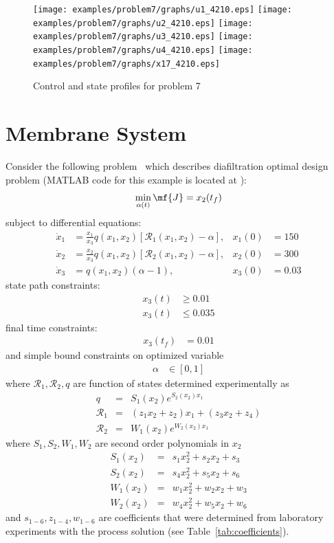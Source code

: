 \begin{figure}[htb]
\texttt{[image: examples/problem7/graphs/u1\_4210.eps]}
\texttt{[image: examples/problem7/graphs/u2\_4210.eps]}
\texttt{[image: examples/problem7/graphs/u3\_4210.eps]}
\texttt{[image: examples/problem7/graphs/u4\_4210.eps]}
\texttt{[image: examples/problem7/graphs/x17\_4210.eps]}
\caption{Control and state profiles for problem 7} \label{fig:prob7}
\end{figure}


\section{Membrane System}
\label{sec:prob7}

Consider the following problem~\citep{fik10jms} which describes
diafiltration optimal design problem (MATLAB code for this example is located at
):
\begin{equation}
  \min_{\alpha(t)} \mf{J} = x_2(t_f)
\end{equation}
subject to differential equations:
\begin{align}
  \dot{x}_1 & = \frac{x_1}{ x_3}
q(x_1, x_2)\left[\mathcal{R}_1(x_1, x_2)-\alpha \right], &
 x_1(0) &= 150  \\
\dot{x}_2 & = \frac{x_2}{ x_3}
q(x_1, x_2)\left[\mathcal{R}_2(x_1, x_2)-\alpha\right], &
 x_2(0) &= 300 \\
\dot{x}_3 &= q(x_1, x_2)(\alpha - 1), &
x_3(0) &= 0.03 
\end{align}
state path constraints:
\begin{align}
  x_3(t) &\ge 0.01 \\
  x_3(t) &\le 0.035
\end{align}
final time constraints:
\begin{align}
  x_3(t_f) &= 0.01 
\end{align}
and simple bound constraints on optimized variable
\begin{align}
  \alpha &\in [0, 1] 
\end{align}
where $\mathcal{R}_1, \mathcal{R}_2, q$ are function of states
determined experimentally as 
\begin{eqnarray} 
q &=& S_1(x_2) e^{S_2(x_2) x_1} \label{eq:Jempiric} \\
\mathcal{R}_1 &=& (z_1 x_2+z_2) x_1  +  ( z_3 x_2+z_4) \label{eq:R1empiric} \\
\mathcal{R}_2 &=& W_1(x_2) e^{W_2(x_2) x_1}	\label{eq:R2empiric}
\end{eqnarray}
where $S_1, S_2, W_1, W_2$ are second order polynomials in $x_2$
\begin{eqnarray} 
S_1(x_2) &=& s_1 x_2^2 + s_2 x_2+s_3 \\
S_2(x_2) &=& s_4 x_2^2 + s_5 x_2+s_6 \\
W_1(x_2) &=& w_1 x_2^2 + w_2 x_2+w_3 \\
W_2(x_2) &=& w_4 x_2^2 + w_5 x_2+w_6 \label{eq:W}
\end{eqnarray}
and $s_{1-6}, z_{1-4},w_{1-6}$ are coefficients that were determined
from laboratory experiments with the process solution
(see Table~\ref{tab:coefficients}).

